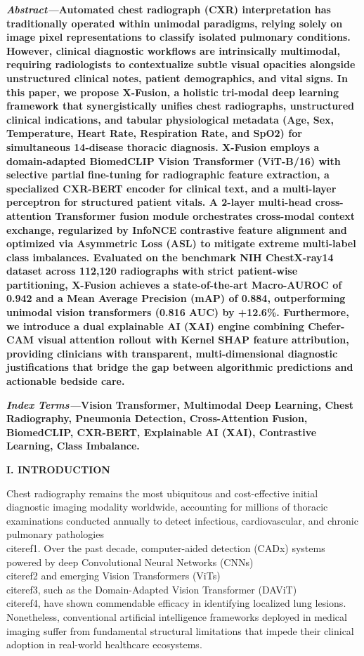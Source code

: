 \documentclass[
]{article}
\begin{document}
\textbf{\emph{Abstract---}Automated chest radiograph (CXR)
interpretation has traditionally operated within unimodal paradigms,
relying solely on image pixel representations to classify isolated
pulmonary conditions. However, clinical diagnostic workflows are
intrinsically multimodal, requiring radiologists to contextualize subtle
visual opacities alongside unstructured clinical notes, patient
demographics, and vital signs. In this paper, we propose X-Fusion, a
holistic tri-modal deep learning framework that synergistically unifies
chest radiographs, unstructured clinical indications, and tabular
physiological metadata (Age, Sex, Temperature, Heart Rate, Respiration
Rate, and SpO2) for simultaneous 14-disease thoracic diagnosis. X-Fusion
employs a domain-adapted BiomedCLIP Vision Transformer (ViT-B/16) with
selective partial fine-tuning for radiographic feature extraction, a
specialized CXR-BERT encoder for clinical text, and a multi-layer
perceptron for structured patient vitals. A 2-layer multi-head
cross-attention Transformer fusion module orchestrates cross-modal
context exchange, regularized by InfoNCE contrastive feature alignment
and optimized via Asymmetric Loss (ASL) to mitigate extreme multi-label
class imbalances. Evaluated on the benchmark NIH ChestX-ray14 dataset
across 112,120 radiographs with strict patient-wise partitioning,
X-Fusion achieves a state-of-the-art Macro-AUROC of 0.942 and a Mean
Average Precision (mAP) of 0.884, outperforming unimodal vision
transformers (0.816 AUC) by +12.6\%. Furthermore, we introduce a dual
explainable AI (XAI) engine combining Chefer-CAM visual attention
rollout with Kernel SHAP feature attribution, providing clinicians with
transparent, multi-dimensional diagnostic justifications that bridge the
gap between algorithmic predictions and actionable bedside care.}

\textbf{\emph{Index Terms---}Vision Transformer, Multimodal Deep
Learning, Chest Radiography, Pneumonia Detection, Cross-Attention
Fusion, BiomedCLIP, CXR-BERT, Explainable AI (XAI), Contrastive
Learning, Class Imbalance.}

\textbf{I. INTRODUCTION}

Chest radiography remains the most ubiquitous and cost-effective initial
diagnostic imaging modality worldwide, accounting for millions of
thoracic examinations conducted annually to detect infectious,
cardiovascular, and chronic pulmonary pathologies \\cite{ref1}. Over the past
decade, computer-aided detection (CADx) systems powered by deep
Convolutional Neural Networks (CNNs) \\cite{ref2} and emerging Vision
Transformers (ViTs) \\cite{ref3}, such as the Domain-Adapted Vision
Transformer (DAViT) \\cite{ref4}, have shown commendable efficacy in
identifying localized lung lesions. Nonetheless, conventional artificial
intelligence frameworks deployed in medical imaging suffer from
fundamental structural limitations that impede their clinical adoption
in real-world healthcare ecosystems.
\end{document}
